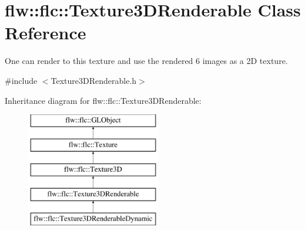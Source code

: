 \hypertarget{classflw_1_1flc_1_1Texture3DRenderable}{}\section{flw\+:\+:flc\+:\+:Texture3\+D\+Renderable Class Reference}
\label{classflw_1_1flc_1_1Texture3DRenderable}


One can render to this texture and use the rendered 6 images as a 2D texture.  




{\ttfamily \#include $<$Texture3\+D\+Renderable.\+h$>$}

Inheritance diagram for flw\+:\+:flc\+:\+:Texture3\+D\+Renderable\+:\begin{figure}[H]
\begin{center}
\leavevmode
\includegraphics[height=5.000000cm]{classflw_1_1flc_1_1Texture3DRenderable}
\end{center}
\end{figure}
